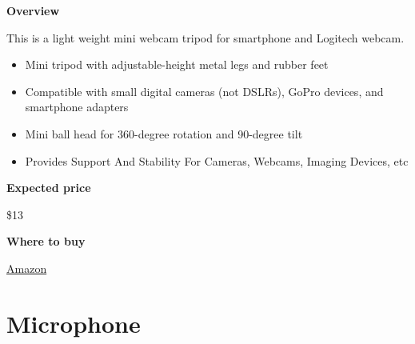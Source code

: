 \begin{gram}
\label{grm:equipment::tripod::mamawin::main}

\textbf{Overview}

This is a light weight mini webcam tripod for smartphone and Logitech webcam.
%
\begin{itemize}
\item
Mini tripod with adjustable-height metal legs and rubber feet

\item
Compatible with small digital cameras (not DSLRs), GoPro devices, and smartphone adapters 

\item
Mini ball head for 360-degree rotation and 90-degree tilt

\item
Provides Support And Stability For Cameras, Webcams, Imaging Devices, etc

\end{itemize}



\textbf{Expected price}

\$13

\textbf{Where to buy}

\href{https://www.amazon.com/Lightweight-Webcam-Tripod-Logitech-Camera/dp/B076SHC6RN/ref=sr_1_1_sspa?crid=2T6CQ3HNRR1XR&keywords=logitech+c920&qid=1582900721&s=electronics&sprefix=logitech+c,electronics,172&sr=1-1-spons&psc=1&spLa=ZW5jcnlwdGVkUXVhbGlmaWVyPUE1VjVUUFpKTU83QUkmZW5jcnlwdGVkSWQ9QTA1NTk1OTVLT1IyTzdRRFVEWkImZW5jcnlwdGVkQWRJZD1BMDEyNzk2NzEyTDVSOEdSQ1QxTEgmd2lkZ2V0TmFtZT1zcF9hdGYmYWN0aW9uPWNsaWNrUmVkaXJlY3QmZG9Ob3RMb2dDbGljaz10cnVl}{Amazon}

\end{gram}

 
\section{Microphone}
\label{sec:equipment::mics}

